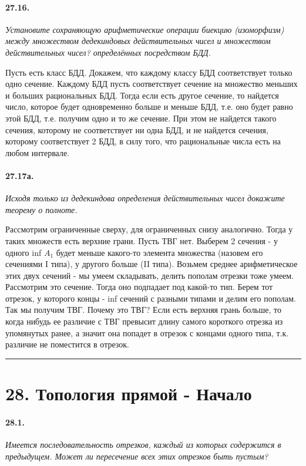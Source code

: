 \documentclass{book}
\begin{document}
\paragraph{27.16.}
\textit{Установите сохраняющую арифметические операции биекцию (изоморфизм) между множеством дедекиндовых действительных чисел и множеством действительных чисел? определённых посредством БДД.}

Пусть есть класс БДД. Докажем, что каждому классу БДД соответствует только одно сечение. Каждому БДД пусть соответствует сечение на множество меньших и больших рациональных БДД. Тогда если есть другое сечение, то найдется число, которое будет одновременно больше и меньше БДД, т.е. оно будет равно этой БДД, т.е. получим одно и то же сечение. При этом не найдется такого сечения, которому не соответствует ни одна БДД, и не найдется сечения, которому соответствует 2 БДД, в силу того, что рациональные числа есть на любом интервале.

\paragraph{27.17а.}
\textit{Исходя только из дедекиндова определения действительных чисел докажите теорему о полноте.}

Рассмотрим ограниченные сверху, для ограниченных снизу аналогично. Тогда у таких множеств есть верхние грани. Пусть ТВГ нет. Выберем 2 сечения - у одного inf $A_1$ будет меньше какого-то элемента множества (назовем его сечениями I типа), у другого больше (II типа). Возьмем среднее арифметическое этих двух сечений - мы умеем складывать, делить пополам отрезки тоже умеем. Рассмотрим это сечение. Тогда оно подпадает под какой-то тип. Берем тот отрезок, у которого концы - inf сечений с разными типами и делим его пополам. Так мы получим ТВГ. Почему это ТВГ? Если есть верхняя грань больше, то когда нибудь ее различие с ТВГ превысит длину самого короткого отрезка  из упомянутых ранее, а значит она попадет в отрезок с концами одного типа, т.к. различие не поместится в отрезок.

\medskip\hrule\medskip
\section*{28. Топология прямой - Начало}

\paragraph{28.1.}
\textit{Имеется последовательность отрезков, каждый из которых содержится в предыдущем. Может ли пересечение всех этих отрезков быть пустым?}
\end{document}
